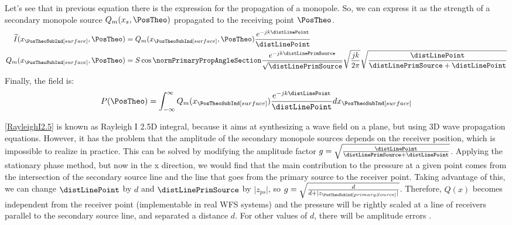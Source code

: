 Let's see that in previous equation there is the expression for the propagation of a monopole. So, we can express it as the strength of a secondary monopole source $Q_m(x_s, \PosTheo)$ propagated to the receiving point $\PosTheo$.
\begin{equation}
\begin{aligned}
\widetilde{I}(x_{\PosTheoSubInd[surface]}, \PosTheo) &= Q_m(x_{\PosTheoSubInd[surface]}, \PosTheo) \frac{e^{-jk\distLinePoint}}{\distLinePoint} \\
Q_m(x_{\PosTheoSubInd[surface]}, \PosTheo) &= S \cos\normPrimaryPropAngleSection \frac{e^{-jk\distLinePrimSource}}{\sqrt{\distLinePrimSource}}\sqrt{\frac{jk}{2\pi}} \sqrt{\frac{\distLinePoint}{\distLinePrimSource + \distLinePoint}}
\end{aligned}
\end{equation}
Finally, the field is:
\begin{equation}
P(\PosTheo) = \int_{-\infty}^{\infty} Q_m(x_{\PosTheoSubInd[surface]})
\frac{e^{-jk\distLinePoint}}{\distLinePoint} dx_{\PosTheoSubInd[surface]}
\label{RayleighI2.5}
\end{equation}

\autoref{RayleighI2.5} is known as Rayleigh I 2.5D integral, because it aims at synthesizing a wave field on a plane, but using 3D wave propagation equations. However, it has the problem that the amplitude of the secondary monopole sources depends on the receiver position, which is impossible to realize in practice.
This can be solved by modifying the amplitude factor $g = \sqrt{\frac{\distLinePoint}{\distLinePrimSource + \distLinePoint}}$.
Applying the stationary phase method, but now in the x direction, we would find that the main contribution to the pressure at a given point comes from the intersection of the secondary source line and the line that goes from the primary source to the receiver point. Taking advantage of this, we can change $\distLinePoint$ by $d$ and $\distLinePrimSource$ by $\vert z_\mathit{ps} \vert$, so $g = \sqrt{\frac{d}{d+\vert z_{\PosTheoSubInd[primarySource]} \vert}}$. Therefore, $Q(x)$ becomes independent from the receiver point (implementable in real WFS systems) and the pressure will be rightly scaled at a line of receivers parallel to the secondary source line, and separated a distance $d$. For other values of $d$, there will be amplitude errors \cite{Verheijen}. 
